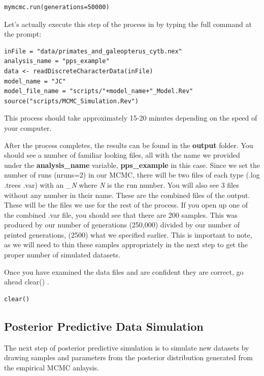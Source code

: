 {\tt \begin{snugshade*}
\begin{lstlisting}
mymcmc.run(generations=50000)
\end{lstlisting}
\end{snugshade*}}


Let's actually execute this step of the process in \RevBayes by typing the full command at the \RevBayes 
prompt: 

{\tt \begin{Snugshade}[184,207,236]
\begin{lstlisting}
inFile = "data/primates_and_galeopterus_cytb.nex"
analysis_name = "pps_example"
data <- readDiscreteCharacterData(inFile)
model_name = "JC"
model_file_name = "scripts/"+model_name+"_Model.Rev"
source("scripts/MCMC_Simulation.Rev")
\end{lstlisting}
\end{Snugshade}}

This process should take approximately 15-20 minutes depending on the speed of your computer.

After the process completes, the results can be found in the \textbf{output} folder. You should see a 
number of familiar looking files, all with the name we provided under the \textbf{analysis\_name} variable, 
\textbf{pps\_example} in this case. Since we set the number of runs (nruns=2) in our MCMC, there will be two files 
of each type (.log .trees .var) with an \_\textit{N} where \textit{N} is the run number. You will also see 3 files without 
any number in their name. These are the combined files of the output. These will be the files we use for 
the rest of the process. If you open up one of the combined .var file, you should see that there are 200 
samples. This was produced by our number of generations (250,000) divided by our number of printed generations,
(2500) what we specified earlier. This is important to note, as we will need to thin these samples 
appropriately in the next step to get the proper number of simulated datasets. 

Once you have examined the data files and are confident they are correct, go ahead clear() \RevBayes.

{\tt \begin{Snugshade}[184,207,236]
\begin{lstlisting}
clear()
\end{lstlisting}
\end{Snugshade}}

\subsection{Posterior Predictive Data Simulation}
The next step of posterior predictive simulation is to simulate new datasets by drawing samples and 
parameters from the posterior distribution generated from the empirical MCMC anlaysis. 

